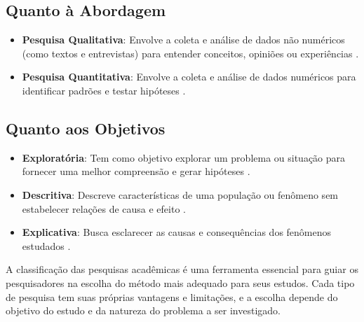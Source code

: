 \subsection{Quanto à Abordagem}
\begin{itemize}
    \item \textbf{Pesquisa Qualitativa}: Envolve a coleta e análise de dados não numéricos (como textos e entrevistas) para entender conceitos, opiniões ou experiências \cite{minayo2010pesquisa}.
    \item \textbf{Pesquisa Quantitativa}: Envolve a coleta e análise de dados numéricos para identificar padrões e testar hipóteses \cite{goldenberg1999arte}.
\end{itemize}

\subsection{Quanto aos Objetivos}
\begin{itemize}
    \item \textbf{Exploratória}: Tem como objetivo explorar um problema ou situação para fornecer uma melhor compreensão e gerar hipóteses \cite{gil2008metodos}.
    \item \textbf{Descritiva}: Descreve características de uma população ou fenômeno sem estabelecer relações de causa e efeito \cite{marconi2010metodologia}.
    \item \textbf{Explicativa}: Busca esclarecer as causas e consequências dos fenômenos estudados \cite{gil2008metodos}.
\end{itemize}

A classificação das pesquisas acadêmicas é uma ferramenta essencial para guiar os pesquisadores na escolha do método mais adequado para seus estudos. Cada tipo de pesquisa tem suas próprias vantagens e limitações, e a escolha depende do objetivo do estudo e da natureza do problema a ser investigado.
